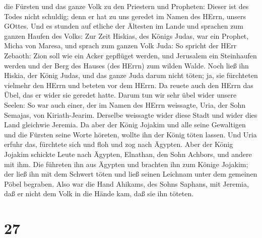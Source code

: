 die Fürsten und das ganze Volk zu den Priestern und Propheten: Dieser
ist des Todes nicht schuldig; denn er hat zu uns geredet im Namen des
HErrn, unsers GOttes.  Und es stunden auf etliche der
Ältesten im Lande und sprachen zum ganzen Haufen des Volks:
 Zur Zeit Hiskias, des Königs Judas, war ein Prophet, Micha
von Maresa, und sprach zum ganzen Volk Juda: So spricht der HErr
Zebaoth: Zion soll wie ein Acker gepflüget werden, und Jerusalem ein
Steinhaufen werden und der Berg des Hauses (des HErrn) zum wilden Walde.
 Noch ließ ihn Hiskia, der König Judas, und das ganze Juda
darum nicht töten; ja, sie fürchteten vielmehr den HErrn und beteten vor
dem HErrn. Da reuete auch den HErrn das Übel, das er wider sie geredet
hatte. Darum tun wir sehr übel wider unsere Seelen:  So war
auch einer, der im Namen des HErrn weissagte, Uria, der Sohn Semajas,
von Kiriath-Jearim. Derselbe weissagte wider diese Stadt und wider dies
Land gleichwie Jeremia.  Da aber der König Jojakim und alle
seine Gewaltigen und die Fürsten seine Worte höreten, wollte ihn der
König töten lassen. Und Uria erfuhr das, fürchtete sich und floh und zog
nach Ägypten.  Aber der König Jojakim schickte Leute nach
Ägypten, Elnathan, den Sohn Achbors, und andere mit ihm. 
Die führeten ihn aus Ägypten und brachten ihn zum Könige Jojakim; der
ließ ihn mit dem Schwert töten und ließ seinen Leichnam unter dem
gemeinen Pöbel begraben.  Also war die Hand Ahikams, des
Sohns Saphans, mit Jeremia, daß er nicht dem Volk in die Hände kam, daß
sie ihn töteten.

\hypertarget{section-26}{%
\section{27}\label{section-26}}

